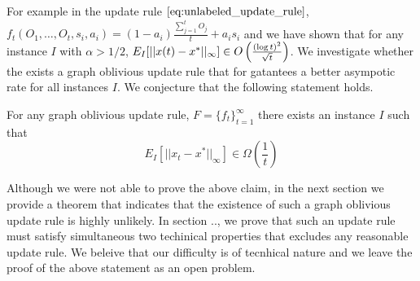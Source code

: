 \noindent For example in the update rule $\ref{eq:unlabeled_update_rule}$, $f_t(O_1,\ldots,O_t,s_i,a_i) = (1-a_i)\frac{\sum_{j=1}^tO_j}{t} + a_is_i$ and we have shown that for any instance $I$ with $\alpha>1/2$, $E_I[||x(t)-x^*||_{\infty}] \in O\left(\frac{(\log t)^2}{\sqrt{t}}\right)$. We investigate whether the exists a graph oblivious update rule that for gatantees a better asympotic rate for all instances $I$. We conjecture that the following statement holds.

\begin{theorem}
For any graph oblivious update rule, $F=\{f_t\}_{t=1}^\infty$ there exists an instance $I$ such that 
$$E_I[||x_t-x^*||_\infty] \in \Omega(\frac{1}{t})$$
\end{theorem}
\noindent Although we were not able to prove the above claim, in the next section we provide a theorem that indicates that the existence of such a graph oblivious update rule is highly unlikely. In section .., we prove that such an update rule must satisfy simultaneous two techinical properties that excludes any reasonable update rule. We beleive that our difficulty is of tecnhical nature and we leave the proof of the above statement as an open problem.  
